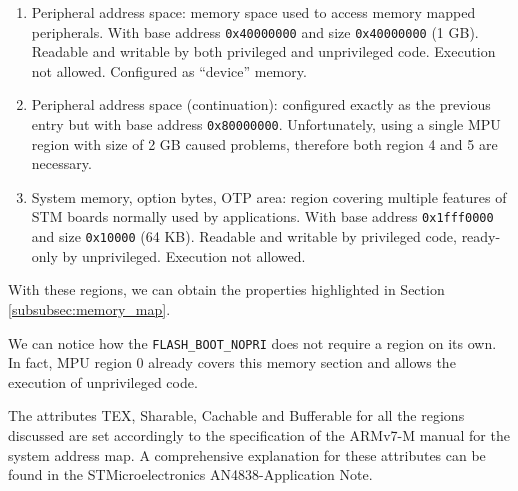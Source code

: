 \documentclass{article}
\begin{document}
\begin{enumerate}
	\item Peripheral address space: memory space used to access memory mapped peripherals. With base address \verb|0x40000000| and size \verb|0x40000000| (1 GB). Readable and writable by both privileged and unprivileged code. Execution not allowed. Configured as ``device'' memory.
	\item Peripheral address space (continuation): configured exactly as the previous entry but with base address \verb|0x80000000|. Unfortunately, using a single MPU region with size of 2 GB caused problems, therefore both region 4 and 5 are necessary.
	\item System memory, option bytes, OTP area: region covering multiple features of STM boards normally used by applications. With base address \verb|0x1fff0000| and size \verb|0x10000| (64 KB). Readable and writable by privileged code, ready-only by unprivileged. Execution not allowed.
\end{enumerate}

With these regions, we can obtain the properties highlighted in Section \ref{subsubsec:memory_map}.

We can notice how the \verb|FLASH_BOOT_NOPRI| does not require a region on its own. In fact, MPU region 0 already covers this memory section and allows the execution of unprivileged code.

The attributes TEX, Sharable, Cachable and Bufferable for all the regions discussed are set accordingly to the specification of the ARMv7-M manual for the system address map\cite{armv7m}. A comprehensive explanation for these attributes can be found in the STMicroelectronics AN4838-Application Note\cite{an4838}.
\end{document}
